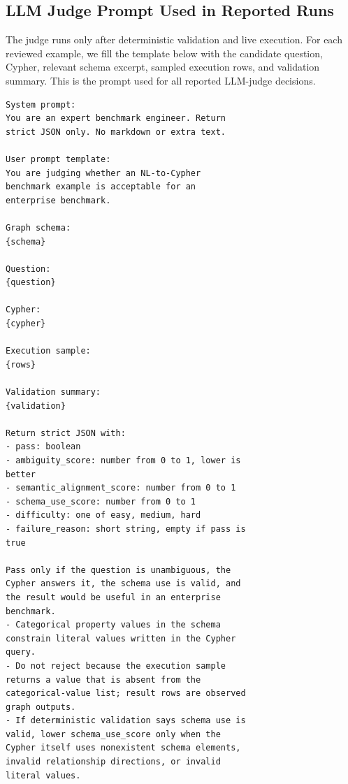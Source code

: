 \subsection{LLM Judge Prompt Used in Reported Runs}
The judge runs only after deterministic validation and live execution. For each reviewed example, we fill the template below with the candidate question, Cypher, relevant schema excerpt, sampled execution rows, and validation summary. This is the prompt used for all reported LLM-judge decisions.
\par\smallskip
\begingroup
\scriptsize
\begin{verbatim}
System prompt:
You are an expert benchmark engineer. Return
strict JSON only. No markdown or extra text.

User prompt template:
You are judging whether an NL-to-Cypher
benchmark example is acceptable for an
enterprise benchmark.

Graph schema:
{schema}

Question:
{question}

Cypher:
{cypher}

Execution sample:
{rows}

Validation summary:
{validation}

Return strict JSON with:
- pass: boolean
- ambiguity_score: number from 0 to 1, lower is
better
- semantic_alignment_score: number from 0 to 1
- schema_use_score: number from 0 to 1
- difficulty: one of easy, medium, hard
- failure_reason: short string, empty if pass is
true

Pass only if the question is unambiguous, the
Cypher answers it, the schema use is valid, and
the result would be useful in an enterprise
benchmark.
- Categorical property values in the schema
constrain literal values written in the Cypher
query.
- Do not reject because the execution sample
returns a value that is absent from the
categorical-value list; result rows are observed
graph outputs.
- If deterministic validation says schema use is
valid, lower schema_use_score only when the
Cypher itself uses nonexistent schema elements,
invalid relationship directions, or invalid
literal values.
\end{verbatim}
\endgroup
